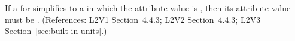 If a \UnitDefinition for  simplifies to a \Unit in which the
 attribute value is , then its
 attribute value must be . (References:
L2V1 Section~4.4.3; L2V2 Section~4.4.3; L2V3 Section~\ref{sec:built-in-units}.)
